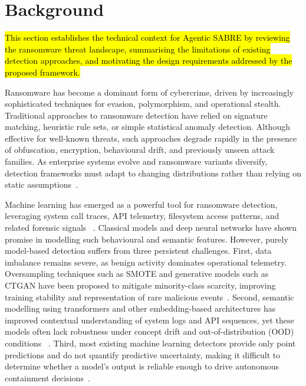 \documentclass[3p]{elsarticle}
\begin{document}
\section{Background}
\label{sec:background}

\hl{This section establishes the technical context for Agentic SABRE by reviewing the ransomware
threat landscape, summarising the limitations of existing detection approaches, and motivating
the design requirements addressed by the proposed framework.}

Ransomware has become a dominant form of cybercrime, driven by increasingly
sophisticated techniques for evasion, polymorphism, and operational stealth.
Traditional approaches to ransomware detection have relied on signature
matching, heuristic rule sets, or simple statistical anomaly detection.
Although effective for well-known threats, such approaches degrade rapidly in the presence of obfuscation, encryption, behavioural drift, and previously unseen attack families. As enterprise systems evolve and ransomware variants diversify, detection frameworks must adapt to changing distributions rather than relying on static assumptions~\cite{fernando2020study, razaulla2023age}.

Machine learning has emerged as a powerful tool for ransomware detection,
leveraging system call traces, API telemetry, filesystem access patterns, and related forensic signals ~\cite{zahoora2022Deep, alraizza2023ransomware, Alraizza2025StorageAP}. Classical models and deep neural networks have shown promise in modelling such behavioural and semantic features. However, purely model-based detection suffers from three persistent challenges. First, data imbalance remains severe, as benign activity dominates operational telemetry. Oversampling techniques such as SMOTE and generative models such as CTGAN have been proposed to mitigate minority-class scarcity, improving training stability and representation of rare malicious events~\cite{chawla2002smote, xu2019ctgan}. Second, semantic modelling using transformers and other embedding-based architectures has improved contextual understanding of system logs and API sequences, yet these models often lack robustness under concept drift and out-of-distribution (OOD) conditions ~\cite{fernando2020study}. Third, most existing machine learning detectors provide only point predictions and do not quantify predictive uncertainty, making it difficult to determine whether a model's output is reliable enough to drive autonomous containment decisions~\cite{gal2016dropout, gawlikowski2023Uncertainity}.
\end{document}
